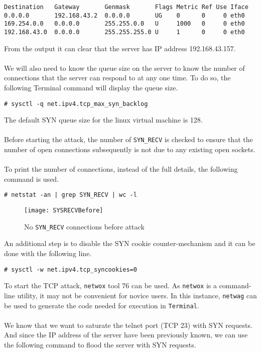 \documentclass[a4paper,12pt]{article}
\begin{document}
\begin{verbatim}
Destination   Gateway       Genmask       Flags Metric Ref Use Iface
0.0.0.0       192.168.43.2  0.0.0.0       UG    0      0     0 eth0
169.254.0.0   0.0.0.0       255.255.0.0   U     1000   0     0 eth0
192.168.43.0  0.0.0.0       255.255.255.0 U     1      0     0 eth0
\end{verbatim}
\vspace{1em}From the output it can clear that the server has IP address 192.168.43.157.\\\\We will also need to know the queue size on the server to know the number of connections that the server can respond to at any one time. To do so, the following Terminal command will display the queue size.
\begin{verbatim}
# sysctl -q net.ipv4.tcp_max_syn_backlog
\end{verbatim}
The default SYN queue size for the linux virtual machine is 128.\\\\
Before starting the attack, the number of \texttt{SYN\_RECV} is checked to ensure that the number of open connections subsequently is not due to any existing open sockets.
\\\\To print the number of connections, instead of the full details, the following command is used.
\begin{verbatim}
# netstat -an | grep SYN_RECV | wc -l
\end{verbatim}
\begin{figure}[H]
	\centering
	\texttt{[image: SYSRECVBefore]}
	\caption{No \texttt{SYN\_RECV} connections before attack}
	\label{fig:sysrecvbefore}
\end{figure}
\noindent An additional step is to disable the SYN cookie counter-mechanism and it can be done with the following line.
\begin{verbatim}
# sysctl -w net.ipv4.tcp_syncookies=0
\end{verbatim}
To start the TCP attack, \texttt{netwox} tool 76 can be used. As \texttt{netwox} is a command-line utility, it may not be convenient for novice users. In this instance, \texttt{netwag} can be used to generate the code needed for execution in \texttt{Terminal}.
\\\\We know that we want to saturate the telnet port (TCP 23) with SYN requests. And since the IP address of the server have been previously known, we can use the following command to flood the server with SYN requests.
\end{document}
